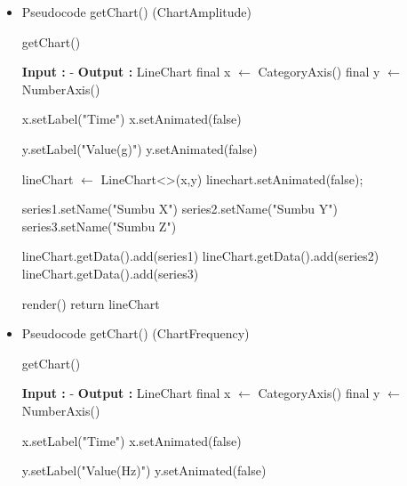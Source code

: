 \begin{itemize}
    \pagebreak
    \item Pseudocode getChart() (ChartAmplitude)
    \begin{algorithm}
        \caption{getChart()}
        \label{alg:getChartAmplitude}
        \begin{algorithmic}[1]
            \State \textbf{Input :} -
            \State \textbf{Output :} LineChart
                \State final x $\leftarrow$ CategoryAxis()
                \State final y $\leftarrow$ NumberAxis()
                
                \State x.setLabel("Time")
                \State x.setAnimated(false)
                
                \State y.setLabel("Value(g)")
                \State y.setAnimated(false)
                
                \State lineChart $\leftarrow$ LineChart<>(x,y)
                \State linechart.setAnimated(false);
                
                \State series1.setName("Sumbu X")
                \State series2.setName("Sumbu Y")
                \State series3.setName("Sumbu Z")
                
                \State lineChart.getData().add(series1)
                \State lineChart.getData().add(series2)
                \State lineChart.getData().add(series3)
                
                \State render()
                \State return lineChart
            \EndFunction
        \end{algorithmic}
    \end{algorithm}
    
    \item Pseudocode getChart() (ChartFrequency)
    \begin{breakablealgorithm}
        \caption{getChart()}
        \label{alg:getChartFrequency}
        \begin{algorithmic}[1]
            \State \textbf{Input :} -
            \State \textbf{Output :} LineChart
                \State final x $\leftarrow$ CategoryAxis()
                \State final y $\leftarrow$ NumberAxis()
                
                \State x.setLabel("Time")
                \State x.setAnimated(false)
                
                \State y.setLabel("Value(Hz)")
                \State y.setAnimated(false)
                

\end{algorithmic}
\end{breakablealgorithm}
\end{itemize}

